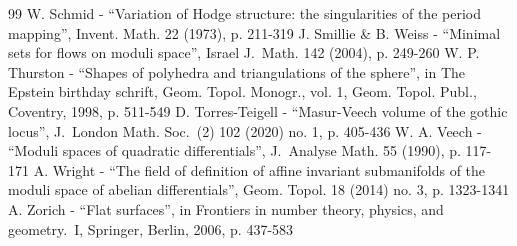 \begin{thebibliography}{99}
 W. Schmid - “Variation of Hodge structure: the singularities of the period mapping”, Invent. Math. 22 (1973), p. 211-319
 J. Smillie \& B. Weiss - “Minimal sets for flows on moduli space”, Israel J. Math. 142 (2004), p. 249-260
 W. P. Thurston - “Shapes of polyhedra and triangulations of the sphere”, in The Epstein birthday schrift, Geom. Topol. Monogr., vol. 1, Geom. Topol. Publ., Coventry, 1998, p. 511-549
 D. Torres-Teigell - “Masur-Veech volume of the gothic locus”, J. London Math. Soc. (2) 102 (2020) no. 1, p. 405-436
 W. A. Veech - “Moduli spaces of quadratic differentials”, J. Analyse Math. 55 (1990), p. 117-171
 A. Wright - “The field of definition of affine invariant submanifolds of the moduli space of abelian differentials”, Geom. Topol. 18 (2014) no. 3, p. 1323-1341
 A. Zorich - “Flat surfaces”, in Frontiers in number theory, physics, and geometry. I, Springer, Berlin, 2006, p. 437-583
\end{thebibliography}
